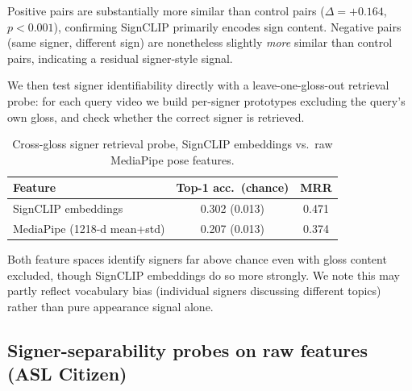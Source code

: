Positive pairs are substantially more similar than control pairs
($\Delta=+0.164$, $p<0.001$), confirming SignCLIP primarily encodes sign
content. Negative pairs (same signer, different sign) are nonetheless
slightly \emph{more} similar than control pairs, indicating a residual
signer-style signal.

We then test signer identifiability directly with a leave-one-gloss-out
retrieval probe: for each query video we build per-signer prototypes
excluding the query's own gloss, and check whether the correct signer is
retrieved.

\begin{table}[t]
\centering\small
\begin{tabular}{lcc}
\hline
Feature & Top-1 acc.\ (chance) & MRR \\
\hline
SignCLIP embeddings & 0.302 (0.013) & 0.471 \\
MediaPipe (1218-d mean+std) & 0.207 (0.013) & 0.374 \\
\hline
\end{tabular}
\caption{Cross-gloss signer retrieval probe, SignCLIP embeddings vs.\ raw
MediaPipe pose features.}
\label{tab:cross_gloss_signer_probe}
\end{table}

Both feature spaces identify signers far above chance even with gloss
content excluded, though SignCLIP embeddings do so more strongly. We note
this may partly reflect vocabulary bias (individual signers discussing
different topics) rather than pure appearance signal alone.

\subsection{Signer-separability probes on raw features (ASL Citizen)}
\label{sec:results-l2-raw}

